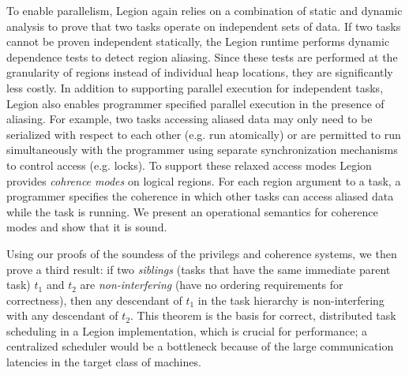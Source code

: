 To enable parallelism, Legion again relies on a combination of static and dynamic
analysis to prove that two tasks operate on independent sets of data.  If two tasks
cannot be proven independent statically, the Legion runtime performs dynamic dependence
tests to detect region aliasing.  Since these tests are performed at the granularity of
regions instead of individual heap locations, they are significantly less costly.
In addition to supporting parallel execution for independent tasks, Legion also enables
programmer specified parallel execution in the presence of aliasing.  For example, two tasks 
accessing aliased data may only need to be serialized
with respect to each other (e.g. run atomically) or are permitted to run
simultaneously with the programmer using separate synchronization mechanisms
to control access (e.g. locks).  To support these relaxed access modes
Legion provides {\em cohrence modes} on logical regions.  For each region
argument to a task, a programmer specifies the coherence in which other tasks
can access aliased data while the task is running.  We present an operational semantics
for coherence modes and show that it is sound.

Using our proofs of the soundess of the privilegs and coherence systems, we then 
prove a third result: if two {\em siblings} (tasks that
have the same immediate parent task) $t_1$ and $t_2$ are 
{\em non-interfering} (have no ordering requirements for correctness), 
then any descendant of $t_1$ in the task hierarchy is non-interfering
with any descendant of $t_2$.  This theorem is the basis for correct, distributed
task scheduling in a Legion implementation, which is crucial for
performance; a centralized scheduler would be a bottleneck
because of the large communication latencies in the target
class of machines.





